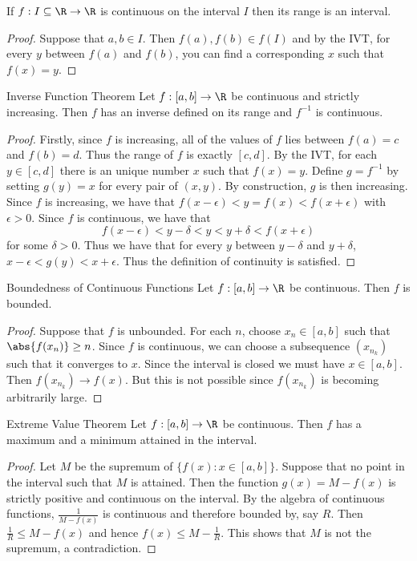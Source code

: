 \begin{prp}{}{} If $f:I\subseteq\R\to\R$ is continuous on the interval $I$ then its range is an interval. \tcbline
\begin{proof} Suppose that $a,b\in I$. Then $f(a),f(b)\in f(I)$ and by the IVT, for every $y$ between $f(a)$ and $f(b)$, you can find a corresponding $x$ such that $f(x)=y$. 
\end{proof}
\end{prp}

\begin{prp}{Inverse Function Theorem}{} Let $f:[a,b]\to\R$ be continuous and strictly increasing. Then $f$ has an inverse defined on its range and $f^{-1}$ is continuous. \tcbline
\begin{proof} Firstly, since $f$ is increasing, all of the values of $f$ lies between $f(a)=c$ and $f(b)=d$. Thus the range of $f$ is exactly $[c,d]$. By the IVT, for each $y\in[c,d]$ there is an unique number $x$ such that $f(x)=y$. Define $g=f^{-1}$ by setting $g(y)=x$ for every pair of $(x,y)$. By construction, $g$ is then increasing. Since $f$ is increasing, we have that $f(x-\epsilon)<y=f(x)<f(x+\epsilon)$ with $\epsilon>0$. Since $f$ is continuous, we have that $$f(x-\epsilon)<y-\delta<y<y+\delta<f(x+\epsilon)$$ for some $\delta>0$. Thus we have that for every $y$ between $y-\delta$ and $y+\delta$, $x-\epsilon<g(y)<x+\epsilon$. Thus the definition of continuity is satisfied. 
\end{proof}
\end{prp}

\begin{thm}{Boundedness of Continuous Functions}{} Let $f:[a,b]\to\R$ be continuous. Then $f$ is bounded. \tcbline
\begin{proof} Suppose that $f$ is unbounded. For each $n$, choose $x_n\in[a,b]$ such that $\abs{f(x_n)}\geq n$. Since $f$ is continuous, we can choose a subsequence $(x_{n_k})$ such that it converges to $x$. Since the interval is closed we must have $x\in[a,b]$. Then $f(x_{n_k})\to f(x)$. But this is not possible since $f(x_{n_k})$ is becoming arbitrarily large. 
\end{proof}
\end{thm}

\begin{thm}{Extreme Value Theorem}{} Let $f:[a,b]\to\R$ be continuous. Then $f$ has a maximum and a minimum attained in the interval. \tcbline
\begin{proof} Let $M$ be the supremum of $\{f(x):x\in[a,b]\}$. Suppose that no point in the interval such that $M$ is attained. Then the function $g(x)=M-f(x)$ is strictly positive and continuous on the interval. By the algebra of continuous functions, $\frac{1}{M-f(x)}$ is continuous and therefore bounded by, say $R$. Then $\frac{1}{R}\leq M-f(x)$ and hence $f(x)\leq M-\frac{1}{R}$. This shows that $M$ is not the supremum, a contradiction. 
\end{proof}
\end{thm}

